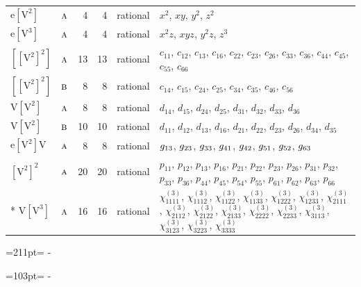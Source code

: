 \documentclass[10pt,a4paper]{article}
\newcommand{\needspace}[1]{\par\penalty-100\begingroup\dimen0=#1\relax\dimen2=\pagegoal
  \advance\dimen2-\pagetotal\ifdim\dimen0>\dimen2\relax\ifdim\dimen2>0pt\vfil\break\fi\fi
  \endgroup}
\numberwithin{equation}{section}
\newcommand{\irr}[1]{\text{\normalfont\scshape #1}}
\newcommand{\jahn}[1]{\mathrm{#1}}
\newlength{\fillwidth}\newlength{\cellwidth}\newlength{\colwidth}
\begin{document}
{\begin{longtable}{@{}llrrl>{\RaggedRight\arraybackslash}p{\fillwidth}@{}}
$\jahn{e[V^{2}]}$ & $\irr{a}$ & 4 & 4 & rational & $x^{2}$, $xy$, $y^{2}$, $z^{2}$\\
$\jahn{e[V^{3}]}$ & $\irr{a}$ & 4 & 4 & rational & $x^{2}z$, $xyz$, $y^{2}z$, $z^{3}$\\
$\jahn{[[V^{2}]^{2}]}$ & $\irr{a}$ & 13 & 13 & rational & $c_{11}$, $c_{12}$, $c_{13}$, $c_{16}$, $c_{22}$, $c_{23}$, $c_{26}$, $c_{33}$, $c_{36}$, $c_{44}$, $c_{45}$, $c_{55}$, $c_{66}$\\
$\jahn{[[V^{2}]^{2}]}$ & $\irr{b}$ & 8 & 8 & rational & $c_{14}$, $c_{15}$, $c_{24}$, $c_{25}$, $c_{34}$, $c_{35}$, $c_{46}$, $c_{56}$\\
$\jahn{V[V^{2}]}$ & $\irr{a}$ & 8 & 8 & rational & $d_{14}$, $d_{15}$, $d_{24}$, $d_{25}$, $d_{31}$, $d_{32}$, $d_{33}$, $d_{36}$\\
$\jahn{V[V^{2}]}$ & $\irr{b}$ & 10 & 10 & rational & $d_{11}$, $d_{12}$, $d_{13}$, $d_{16}$, $d_{21}$, $d_{22}$, $d_{23}$, $d_{26}$, $d_{34}$, $d_{35}$\\
$\jahn{e[V^{2}]V}$ & $\irr{a}$ & 8 & 8 & rational & $\mathnormal{g}_{13}$, $\mathnormal{g}_{23}$, $\mathnormal{g}_{33}$, $\mathnormal{g}_{41}$, $\mathnormal{g}_{42}$, $\mathnormal{g}_{51}$, $\mathnormal{g}_{52}$, $\mathnormal{g}_{63}$\\
$\jahn{[V^{2}]^{2}}$ & $\irr{a}$ & 20 & 20 & rational & $p_{11}$, $p_{12}$, $p_{13}$, $p_{16}$, $p_{21}$, $p_{22}$, $p_{23}$, $p_{26}$, $p_{31}$, $p_{32}$, $p_{33}$, $p_{36}$, $p_{44}$, $p_{45}$, $p_{54}$, $p_{55}$, $p_{61}$, $p_{62}$, $p_{63}$, $p_{66}$\\*
$\jahn{V[V^{3}]}$ & $\irr{a}$ & 16 & 16 & rational & $\chi^{(3)}_{1111}$, $\chi^{(3)}_{1112}$, $\chi^{(3)}_{1122}$, $\chi^{(3)}_{1133}$, $\chi^{(3)}_{1222}$, $\chi^{(3)}_{1233}$, $\chi^{(3)}_{2111}$, $\chi^{(3)}_{2112}$, $\chi^{(3)}_{2122}$, $\chi^{(3)}_{2133}$, $\chi^{(3)}_{2222}$, $\chi^{(3)}_{2233}$, $\chi^{(3)}_{3113}$, $\chi^{(3)}_{3123}$, $\chi^{(3)}_{3223}$, $\chi^{(3)}_{3333}$\\
\bottomrule\end{longtable}}
\needspace{211pt}
\needspace{103pt}
\end{document}
